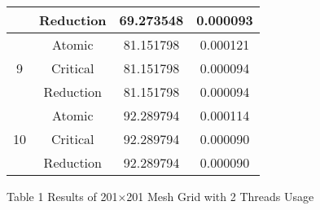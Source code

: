\documentclass[10pt]{article}
\begin{document}
\begin{center}
\begin{tabular}{|c|c|c|c|}
\hline
 & Reduction & 69.273548 & 0.000093 \\
\hline
\multirow[t]{3}{*}{9} & Atomic & 81.151798 & 0.000121 \\
\hline
 & Critical & 81.151798 & 0.000094 \\
\hline
 & Reduction & 81.151798 & 0.000094 \\
\hline
\multirow[t]{3}{*}{10} & Atomic & 92.289794 & 0.000114 \\
\hline
 & Critical & 92.289794 & 0.000090 \\
\hline
 & Reduction & 92.289794 & 0.000090 \\
\hline
\end{tabular}
\end{center}

Table 1 Results of 201×201 Mesh Grid with 2 Threads Usage
\end{document}
